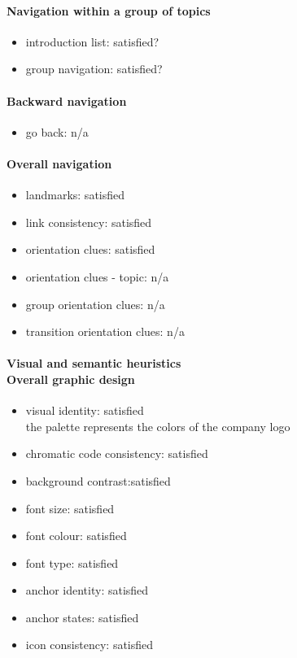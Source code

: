 \begin{enumerate}
	\paragraph*{Navigation within a group of topics}
	\begin{itemize}
		\item introduction list: satisfied?
		\item group navigation: satisfied?
	\end{itemize}
	
	\paragraph*{Backward navigation}
	\begin{itemize}
		\item go back: n/a
	\end{itemize}
	
	\paragraph*{Overall navigation}
	\begin{itemize}
		\item landmarks: satisfied
		\item link consistency: satisfied
		\item orientation clues: satisfied
		\item orientation clues - topic: n/a
		\item group orientation clues: n/a
		\item transition orientation clues: n/a
	\end{itemize}	
	
	\paragraph*{Visual and semantic heuristics \\ Overall graphic design }
	\begin{itemize}
		\item visual identity: satisfied\\
		the palette represents the colors of the company logo
		\item chromatic code consistency: satisfied
		\item background contrast:satisfied
		\item font size: satisfied
		\item font colour: satisfied
		\item font type: satisfied
		\item anchor identity: satisfied
		\item anchor states: satisfied
		\item icon consistency: satisfied
	\end{itemize}
	

\end{enumerate}

